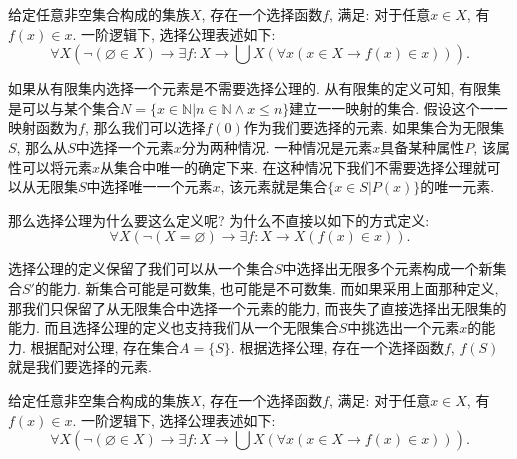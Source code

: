 \begin{axiom}[选择公理]
	给定任意非空集合构成的集族$X$, 存在一个选择函数$f$, 满足: 对于任意$x\in X$, 有$f(x)\in x$. 一阶逻辑下, 选择公理表述如下:
	\begin{equation}
		\forall X(\neg(\varnothing\in X)\rightarrow \exists f\colon X\rightarrow \bigcup X(\forall x(x\in X\rightarrow f(x)\in x))).
	\end{equation}
\end{axiom}

如果从有限集内选择一个元素是不需要选择公理的. 从有限集的定义可知, 有限集是可以与某个集合$N=\{x\in \mathbb{N}|n\in \mathbb{N}\wedge x\leqslant n\}$建立一一映射的集合. 假设这个一一映射函数为$f$, 那么我们可以选择$f(0)$作为我们要选择的元素. 如果集合为无限集$S$, 那么从$S$中选择一个元素$x$分为两种情况. 一种情况是元素$x$具备某种属性$P$, 该属性可以将元素$x$从集合中唯一的确定下来. 在这种情况下我们不需要选择公理就可以从无限集$S$中选择唯一一个元素$x$, 该元素就是集合$\{x\in S|P(x)\}$的唯一元素.

那么选择公理为什么要这么定义呢? 为什么不直接以如下的方式定义:
\[
\forall X(\neg(X=\varnothing)\rightarrow \exists f\colon X\rightarrow X(f(x)\in x)).
\]

选择公理的定义保留了我们可以从一个集合$S$中选择出无限多个元素构成一个新集合$S'$的能力. 新集合可能是可数集, 也可能是不可数集. 而如果采用上面那种定义, 那我们只保留了从无限集合中选择一个元素的能力, 而丧失了直接选择出无限集的能力. 而且选择公理的定义也支持我们从一个无限集合$S$中挑选出一个元素$x$的能力. 根据配对公理, 存在集合$A=\{S\}$. 根据选择公理, 存在一个选择函数$f$, $f(S)$就是我们要选择的元素.

\begin{axiom}[依赖选择公理]
	给定任意非空集合构成的集族$X$, 存在一个选择函数$f$, 满足: 对于任意$x\in X$, 有$f(x)\in x$. 一阶逻辑下, 选择公理表述如下:
	\begin{equation}
		\forall X(\neg(\varnothing\in X)\rightarrow \exists f\colon X\rightarrow \bigcup X(\forall x(x\in X\rightarrow f(x)\in x))).
	\end{equation}
\end{axiom}
